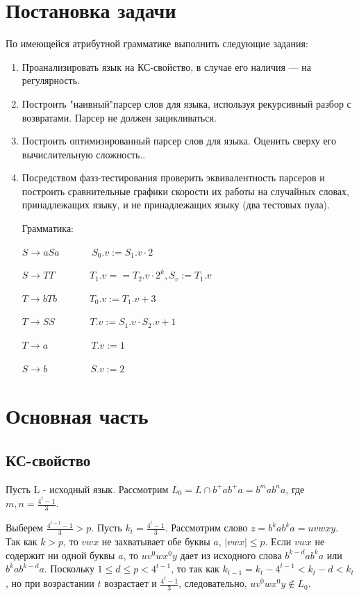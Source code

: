 \documentclass[a4paper, 14pt]{extarticle}
\begin{document}
\section{Постановка задачи}\label{Sect::task}
По имеющейся атрибутной грамматике выполнить следующие задания:
\begin{enumerate}
    \item Проанализировать язык на КС-свойство, в случае его наличия — на регулярность.
    \item Построить "наивный"парсер слов для языка, используя рекурсивный разбор с возвратами. Парсер не должен зацикливаться.
    \item Построить оптимизированный парсер слов для языка. Оценить сверху его вычислительную сложность..
    \item Посредством фазз-тестирования проверить эквивалентность парсеров и построить сравнительные графики скорости их работы на случайных словах, принадлежащих языку, и не принадлежащих языку (два тестовых пула).

    Грамматика: 

    $S \rightarrow aSa \; \; \; \;\; \; \; \;\; \; \; \; S_0.v := S_1.v\cdot2$

    $S \rightarrow TT \; \; \; \;\; \; \; \;\; \; \; \;\;  T_1.v == T_2.v \cdot 2^k, S_v := T_1.v$

    $T \rightarrow bTb \; \; \; \;\; \; \; \;\; \; \; \; T_0.v := T_1.v+3$

    $T \rightarrow SS \; \; \; \;\; \; \; \;\; \; \; \;\; T.v := S_1.v \cdot S_2.v + 1$

    $T \rightarrow a \; \; \; \;\; \; \; \;\; \; \; \;\;\;\;\; T.v := 1$

    $S \rightarrow b \; \; \; \;\; \; \; \;\; \; \; \;\;\;\;\; S.v := 2$
\end{enumerate}

\clearpage
\section{Основная часть}\label{Sect::realisation}

\subsection{КС-свойство}

Пусть L - исходный язык. Рассмотрим $L_0 = L \cap b^+ab^+a = b^mab^na$, где $m,n = \frac{4^t-1}{3}$. 

Выберем $\frac{4^{t-1} - 1}{3} > p$. Пусть $k_t = \frac{4^t-1}{3}$. Рассмотрим слово $z = b^kab^ka = uvwxy$. Так как $k>p$, то $vwx$ не захватывает обе буквы $a$, $|vwx|\leq p$. Если $vwx$ не содержит ни одной буквы $a$, то $uv^0wx^0y$ дает из исходного слова $b^{k-d}ab^ka$ или $b^kab^{k-d}a$. Поскольку $1\leq d \leq p < 4^{t-1}$, то так как $k_{t-1} = k_t - 4^{t-1} < k_t - d < k_t$, но при возрастании $t$ возрастает и $\frac{4^t-1}{3}$, следовательно, $uv^0wx^0y \notin L_0$.
\end{document}
